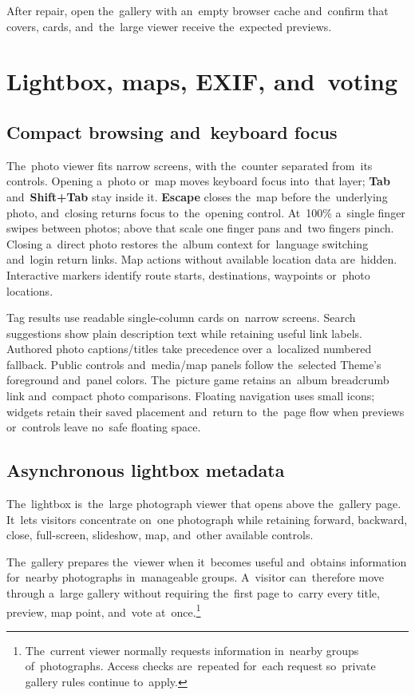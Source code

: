 \documentclass[11pt,a4paper]{article}
\newcommand{\ui}[1]{\textbf{#1}}
\begin{document}
After repair, open the~gallery with an~empty browser cache and~confirm that
covers, cards, and~the~large viewer receive the~expected previews.

\section{Lightbox, maps, EXIF, and~voting}
\label{sec:lightbox}

\subsection{Compact browsing and~keyboard focus}

The~photo viewer fits narrow screens, with the~counter separated from~its
controls. Opening a~photo or~map moves keyboard focus into~that layer;
\ui{Tab} and~\ui{Shift+Tab} stay inside it. \ui{Escape} closes the~map before
the~underlying photo, and~closing returns focus to~the~opening control.
At~100\% a~single finger swipes between photos; above that scale one finger
pans and~two fingers pinch. Closing a~direct photo restores the~album context
for~language switching and~login return links. Map actions without available
location data are~hidden. Interactive markers identify route starts,
destinations, waypoints or~photo locations.

Tag results use readable single-column cards on~narrow screens. Search
suggestions show plain description text while retaining useful link labels.
Authored photo captions/titles take precedence over a~localized numbered
fallback. Public controls and~media/map panels follow the~selected Theme's
foreground and~panel colors. The~picture game retains an~album breadcrumb
link and~compact photo comparisons. Floating navigation uses small icons;
widgets retain their saved placement and~return to~the~page flow when
previews or~controls leave no~safe floating space.

\subsection{Asynchronous lightbox metadata}

The~lightbox is~the~large photograph viewer that opens above the~gallery page.
It~lets visitors concentrate on~one photograph while retaining forward,
backward, close, full-screen, slideshow, map, and~other available controls.

The~gallery prepares the~viewer when it~becomes useful and~obtains information
for~nearby photographs in~manageable groups. A~visitor can~therefore move
through a~large gallery without requiring the~first page to~carry every title,
preview, map point, and~vote at~once.\footnote{The~current viewer normally
requests information in~nearby groups of~photographs. Access checks are~repeated
for~each request so~private gallery rules continue to~apply.}
\end{document}
